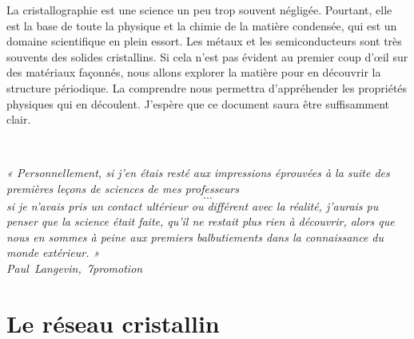 \documentclass[a4paper,justified,twoside,nobib]{tufte-book}
\renewcommand{\=}[1]{\stackrel{#1}{=}} %
\begin{document}
\vspace{2cm}

La cristallographie est une science un peu trop souvent négligée. Pourtant,
elle est la base de toute la physique et la chimie de la matière condensée, qui
est un domaine scientifique en plein essort.
Les métaux et les semiconducteurs sont très souvents des solides cristallins.
Si cela n'est pas évident au premier coup d'œil sur des matériaux façonnés,
nous allons explorer la matière pour en découvrir la structure périodique.
La comprendre nous permettra d'appréhender les propriétés physiques qui en
découlent. J'espère que ce document saura être suffisamment clair.



\tableofcontents\thispagestyle{empty}



\cleardoublepage
~\vfill
\begin{doublespace}
\noindent\fontsize{18}{22}\selectfont\itshape
\nohyphenation
« Personnellement, si j'en étais resté aux impressions éprouvées à la suite des 
premières leçons de sciences de mes professeurs \[...\] si je n'avais pris un
contact ultérieur ou différent avec la réalité, j'aurais pu penser que la 
science était faite, qu'il ne restait plus rien à découvrir, alors que nous en 
sommes à peine aux premiers balbutiements dans la connaissance du monde 
extérieur. »\\
\mbox{Paul Langevin, 7\ieme promotion}
\end{doublespace}
\vfill
\vfill

\mainmatter

\part[LE RÉSEAU CRISTALLIN]{Le réseau cristallin}




%
%

\end{document}
